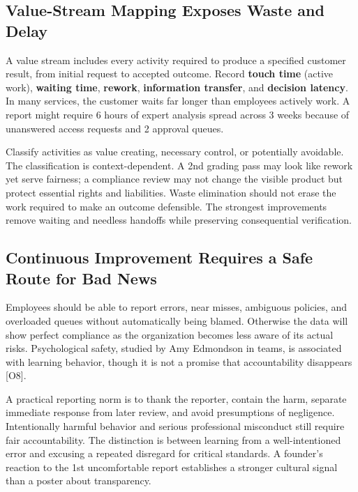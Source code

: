 \subsection{Value-Stream Mapping Exposes Waste and Delay}
\label{sec:value_stream_mapping}

A value stream includes every activity required to produce a specified customer result, from initial request to accepted outcome. Record \textbf{touch time} (active work), \textbf{waiting time}, \textbf{rework}, \textbf{information transfer}, and \textbf{decision latency}. In many services, the customer waits far longer than employees actively work. A report might require 6 hours of expert analysis spread across 3 weeks because of unanswered access requests and 2 approval queues.

Classify activities as value creating, necessary control, or potentially avoidable. The classification is context-dependent. A 2nd grading pass may look like rework yet serve fairness; a compliance review may not change the visible product but protect essential rights and liabilities. Waste elimination should not erase the work required to make an outcome defensible. The strongest improvements remove waiting and needless handoffs while preserving consequential verification.

\subsection{Continuous Improvement Requires a Safe Route for Bad News}
\label{sec:psychological_safety_reporting}

Employees should be able to report errors, near misses, ambiguous policies, and overloaded queues without automatically being blamed. Otherwise the data will show perfect compliance as the organization becomes less aware of its actual risks. Psychological safety, studied by Amy Edmondson in teams, is associated with learning behavior, though it is not a promise that accountability disappears [O8].

A practical reporting norm is to thank the reporter, contain the harm, separate immediate response from later review, and avoid presumptions of negligence. Intentionally harmful behavior and serious professional misconduct still require fair accountability. The distinction is between learning from a well-intentioned error and excusing a repeated disregard for critical standards. A founder's reaction to the 1st uncomfortable report establishes a stronger cultural signal than a poster about transparency.


